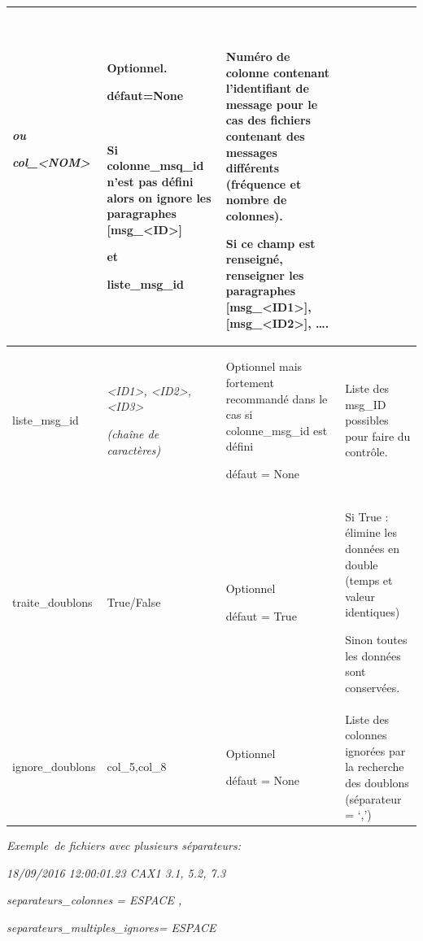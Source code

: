 \begin{center}
\begin{supertabular}{|p{3.592cm}|p{2.116cm}|p{4.099cm}|p{5.393cm}|}
{\itshape ou }

{\itshape col\_{\textless}NOM{\textgreater}}

~

~
 &
Optionnel.

défaut=None

~

Si colonne\_msq\_id n'est pas défini alors on ignore les paragraphes [msg\_{\textless}ID{\textgreater}]

et 

liste\_msg\_id &
~

Numéro de colonne contenant l'identifiant de message pour le cas des fichiers contenant des messages différents
(fréquence et nombre de colonnes).

Si ce champ est renseigné, renseigner les paragraphes [msg\_{\textless}ID1{\textgreater}],
[msg\_{\textless}ID2{\textgreater}], {\dots}.\\\hline
liste\_msg\_id &
\textit{{\textless}ID1{\textgreater}, {\textless}ID2{\textgreater},{\textless}ID3{\textgreater}}

{\itshape (chaîne de caractères)} &
Optionnel mais fortement recommandé dans le cas si colonne\_msg\_id est défini 

défaut = None &
Liste des msg\_ID possibles pour faire du contrôle.\\\hline
traite\_doublons  &
True/False &
Optionnel

défaut = True &
Si True : élimine les données en double (temps et valeur identiques)

Sinon toutes les données sont conservées.\\\hline
ignore\_doublons &
col\_5,col\_8 &
Optionnel

défaut = None &
Liste des colonnes ignorées par la recherche des doublons (séparateur = `,')\\\hline
\end{supertabular}
\end{center}

\medskip
{\itshape\color{black}
Exemple~de fichiers avec plusieurs séparateurs:}

{\itshape\color{black}
18/09/2016 12:00:01.23 CAX1 3.1, 5.2, 7.3}

\medskip
{\itshape\color{black}
separateurs\_colonnes = ESPACE ,}

{\itshape\color{black}
separateurs\_multiples\_ignores= ESPACE}

